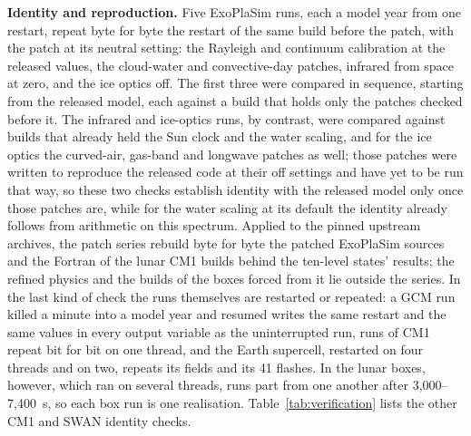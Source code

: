 \textbf{Identity and reproduction.} Five ExoPlaSim runs, each a model year from one restart, repeat byte for byte
the restart of the same build before the patch, with the patch at its neutral setting: the Rayleigh and
continuum calibration at the released values, the cloud-water and convective-day patches, infrared from space at
zero, and the ice optics off. The first three were compared in sequence, starting from the released model, each against a build that holds only the patches checked before it. The infrared and ice-optics runs, by contrast, were compared
against builds that already held the Sun clock and the water scaling, and for the ice optics the curved-air, gas-band
and longwave patches as well; those patches were written to reproduce the released code at their off settings
and have yet to be run that way, so these two checks establish identity with the released model only once those patches are,
while for the water scaling at its default the identity already follows from arithmetic on this
spectrum. Applied to the pinned upstream archives, the patch series rebuild byte for byte the patched
ExoPlaSim sources and the Fortran of the lunar CM1 builds behind the ten-level states' results; the refined physics
and the builds of the boxes forced from it lie outside the series. In the last kind of check the runs themselves are restarted or repeated: a GCM run killed a minute into a model year and resumed writes the same restart and the same values in every output variable as the uninterrupted run, runs of CM1 repeat bit
for bit on one thread, and the Earth supercell, restarted on four threads and on two, repeats its fields and its 41
flashes. In the lunar boxes, however, which ran on several threads, runs part from one another after
3,000--7,400~s, so each box run is one realisation. Table~\ref{tab:verification} lists the other CM1 and SWAN
identity checks.

